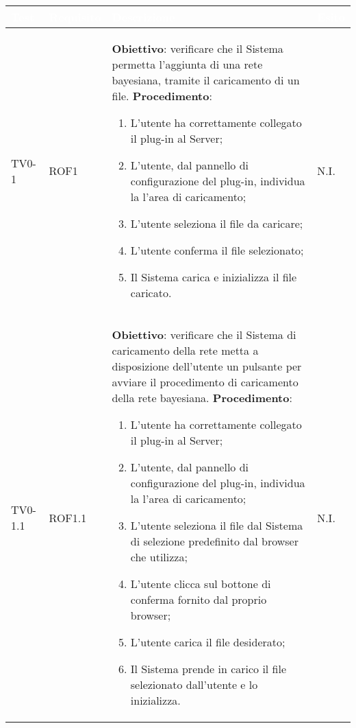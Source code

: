 \begin{longtable}{|C{.15\textwidth}|C{.13\textwidth}|m{.65\textwidth}|C{.08\textwidth}|}
\hline
{}\textbf{\textcolor{white}{Test}} & \textbf{\textcolor{white}{Requisito}} & \textbf{\textcolor{white}{Descrizione}} & \textbf{\textcolor{white}{Esito}}\\
\hline \hline
\endhead

TV0-1 & ROF1 &
	\textbf{Obiettivo}: verificare che il Sistema permetta l'aggiunta di una rete bayesiana, tramite il caricamento di un file. \newline
	\textbf{Procedimento}:
	\begin{enumerate}
		\item L'utente ha correttamente collegato il plug-in al Server;
		\item L'utente, dal pannello di configurazione del plug-in, individua la l'area di caricamento;
		\item L'utente seleziona il file da caricare;
		\item L'utente conferma il file selezionato;
		\item Il Sistema carica e inizializza il file caricato.
	\end{enumerate} & N.I. \\
\hline

 TV0-1.1 & ROF1.1 &
	\textbf{Obiettivo}: verificare che il Sistema di caricamento della rete metta a disposizione dell'utente un pulsante per avviare il procedimento di caricamento della rete bayesiana.
	\textbf{Procedimento}:
	\begin{enumerate}
		\item L'utente ha correttamente collegato il plug-in al Server;
		\item L'utente, dal pannello di configurazione del plug-in, individua la l'area di caricamento;
		\item L'utente seleziona il file dal Sistema di selezione predefinito dal browser che utilizza;
		\item L'utente clicca sul bottone di conferma fornito dal proprio browser;
		\item L'utente carica il file desiderato;
		\item Il Sistema prende in carico il file selezionato dall'utente e lo inizializza.
	\end{enumerate}
	& N.I. \\
\hline


\end{longtable}

